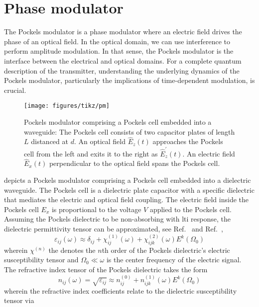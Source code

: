 \section{Phase modulator}

The Pockels modulator is a phase modulator where an electric field drives the phase of an optical field.
In the optical domain, we can use interference to perform amplitude modulation.
In that sense, the Pockels modulator is the interface between the electrical and optical domains.
For a complete quantum description of the transmitter, understanding the underlying dynamics of the Pockels modulator, particularly the implications of time-dependent modulation, is crucial.

\begin{figure}[htb]
    \centering
    \texttt{[image: figures/tikz/pm]}
    \caption{Pockels modulator comprising a Pockels cell embedded into a waveguide: The Pockels cell consists of two capacitor plates of length $L$ distanced at $d$. An optical field $\hat{E}_z(t)$ approaches the Pockels cell from the left and exits it to the right as $\hat{E}_z^\prime(t)$. An electric field $\hat{E}_x(t)$ perpendicular to the optical field spans the Pockels cell.}\label{fig:pm}
\end{figure}
 depicts a Pockels modulator comprising a Pockels cell embedded into a dielectric waveguide.
The Pockels cell is a dielectric plate capacitor with a specific dielectric that mediates the electric and optical field coupling.
The electric field inside the Pockels cell $E_x$ is proportional to the voltage $V$ applied to the Pockels cell.
Assuming the Pockels dielectric to be non-absorbing with \gls{lti} response, the dielectric permittivity tensor can be approximated, see Ref.~\cite{Murti2014} and Ref.~\cite[p.~1070]{Mandel1995},
\begin{equation}
	\varepsilon_{ij}(\omega)
	\approx
	\delta_{ij}
	+
	\chi_{ij}^{(1)}(\omega)
	+
	\chi_{ijk}^{(2)}(\omega)
	E^k(\Omega_0)
\end{equation}
wherein $\chi^{(n)}$ the denotes the $n$th order of the Pockels dielectric's electric susceptibility tensor and $\Omega_0\ll\omega$ is the center frequency of the electric signal.
The refractive index tensor of the Pockels dielectric takes the form
\begin{equation}
	n_{ij}(\omega)
	=
	\sqrt{\varepsilon_{ij}}
	\approx
	n_{ij}^{(0)}
	+
	n_{ijk}^{(1)}(\omega)
	E^k(\Omega_0)
\end{equation}
wherein the refractive index coefficients relate to the dielectric susceptibility tensor via~\cite{Rerat2020}

